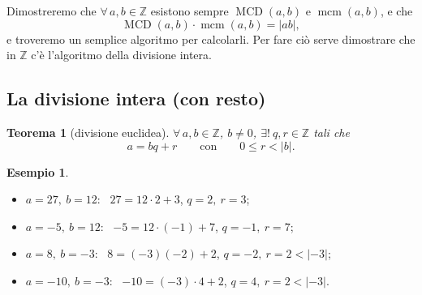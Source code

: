 \documentclass[11pt,a4paper]{article}
\newcommand{\Z}{\mathbb{Z}}
\theoremstyle{definition}
\newtheorem{esempio}[definizione]{Esempio}
\theoremstyle{plain}
\newtheorem{teorema}[definizione]{Teorema}
\theoremstyle{remark}
\begin{document}
Dimostreremo che $\forall\,a,b\in\Z$ esistono sempre $\operatorname{MCD}(a,b)$ e $\operatorname{mcm}(a,b)$, e che
\[
\operatorname{MCD}(a,b)\cdot\operatorname{mcm}(a,b)=|ab|,
\]
e troveremo un semplice algoritmo per calcolarli. Per fare ciò serve dimostrare che in $\Z$ c'è l'algoritmo della divisione intera.

\subsection{La divisione intera (con resto)}

\begin{teorema}[divisione euclidea]\label{thm:divisione}
$\forall\,a,b\in\Z$, $b\neq0$, $\exists!\ q,r\in\Z$ tali che
\[
a=bq+r\qquad\text{con}\qquad 0\le r<|b| .
\]
\end{teorema}

\begin{esempio}
\begin{itemize}[nosep]
\item $a=27,\ b=12$: \ $27=12\cdot2+3$, \quad $q=2,\ r=3$;
\item $a=-5,\ b=12$: \ $-5=12\cdot(-1)+7$, \quad $q=-1,\ r=7$;
\item $a=8,\ b=-3$: \ $8=(-3)(-2)+2$, \quad $q=-2,\ r=2<|-3|$;
\item $a=-10,\ b=-3$: \ $-10=(-3)\cdot4+2$, \quad $q=4,\ r=2<|-3|$.
\end{itemize}
\end{esempio}
\end{document}
